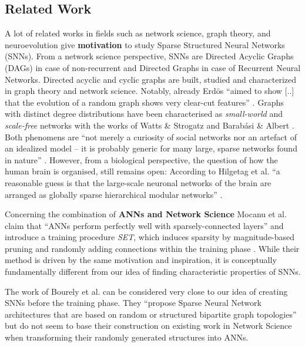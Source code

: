 \documentclass[runningheads]{llncs}
\begin{document}
\subsection*{Related Work}
A lot of related works in fields such as network science, graph theory, and neuroevolution give \textbf{motivation} to study Sparse Structured Neural Networks (SNNs).
From a network science perspective, SNNs are Directed Acyclic Graphs (DAGs) in case of non-recurrent and Directed Graphs in case of Recurrent Neural Networks.
Directed acyclic and cyclic graphs are built, studied and characterized in graph theory and network science.
Notably, already Erd{\"o}s ``aimed to show [..] that the evolution of a random graph shows very clear-cut features'' \cite{erds1960evolution}.
Graphs with distinct degree distributions have been characterised as \textit{small-world} and \textit{scale-free} networks with the works of Watts \& Strogatz \cite{watts1998collective} and Barab{\'a}si \& Albert \cite{albert2002statistical}.
Both phenomens are ``not merely a curiosity of social networks nor an artefact of an idealized model -- it is probably generic for many large, sparse networks found in nature'' \cite{watts1998collective}.
However, from a biological perspective, the question of how the human brain is organised, still remains open:
According to Hilgetag et al. ``a reasonable guess is that the large-scale neuronal networks of the brain are arranged as globally sparse hierarchical modular networks'' \cite{hilgetag2016brain}.

Concerning the combination of \textbf{ANNs and Network Science} Mocanu et al. claim that ``ANNs perform perfectly well with sparsely-connected layers'' and introduce a training procedure \textit{SET}, which induces sparsity by magnitude-based pruning and randomly adding connections within the training phase \cite{mocanu2017evolutionary}.
While their method is driven by the same motivation and inspiration, it is conceptually fundamentally different from our idea of finding characteristic properties of SNNs.

The work of Bourely et al. can be considered very close to our idea of creating SNNs before the training phase.
They ``propose Sparse Neural Network architectures that are based on random or structured bipartite graph topologies'' \cite{bourely2017sparse} but do not seem to base their construction on existing work in Network Science when transforming their randomly generated structures into ANNs.
\end{document}
